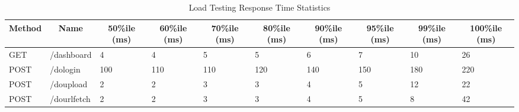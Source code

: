 \begin{table*}[]
  \caption{Load Testing Response Time Statistics}
  \label{tab:loadrespstat}
\begin{tabular}{|l|l|l|l|l|l|l|l|l|l|}
\hline
\multicolumn{1}{|c|}{\textbf{Method}} & \multicolumn{1}{c|}{\textbf{Name}} & \multicolumn{1}{c|}{\textbf{50\%ile (ms)}} & \multicolumn{1}{c|}{\textbf{60\%ile (ms)}} & \multicolumn{1}{c|}{\textbf{70\%ile (ms)}} & \multicolumn{1}{c|}{\textbf{80\%ile (ms)}} & \multicolumn{1}{c|}{\textbf{90\%ile (ms)}} & \multicolumn{1}{c|}{\textbf{95\%ile (ms)}} & \multicolumn{1}{c|}{\textbf{99\%ile (ms)}} & \multicolumn{1}{c|}{\textbf{100\%ile (ms)}} \\ \hline
GET                                   & /dashboard                         & 4                                          & 4                                          & 5                                          & 5                                          & 6                                          & 7                                          & 10                                         & 26                                          \\ \hline
{\color[HTML]{2A2B2E} POST}           & /dologin                           & 100                                        & 110                                        & 110                                        & 120                                        & 140                                        & 150                                        & 180                                        & 220                                         \\ \hline
{\color[HTML]{2A2B2E} POST}           & /doupload                          & 2                                          & 2                                          & 3                                          & 3                                          & 4                                          & 5                                          & 12                                         & 22                                          \\ \hline
POST                                  & /dourlfetch                        & 2                                          & 2                                          & 3                                          & 3                                          & 4                                          & 5                                          & 8                                          & 42                                          \\ \hline

\end{tabular}
\end{table*}
